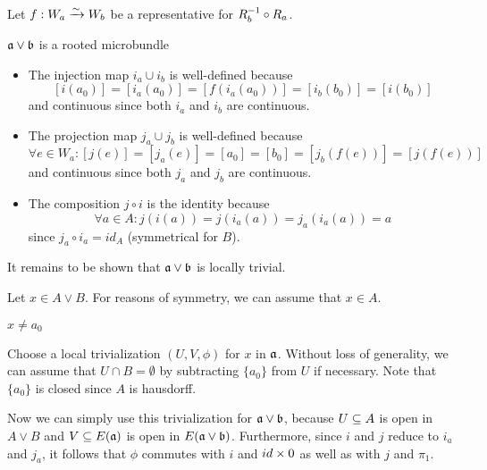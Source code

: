\begin{myproof}
    Let $f: W_a \xrightarrow{\sim} W_b$ be a representative for $R_b^{-1} \circ R_a$.

    \begin{sectionize}
        \item $\ba \vee \bb$ is a rooted microbundle
        \begin{itemize}
            \item The injection map $i_a \cup i_b$ is well-defined because 
            \[ [i(a_0)] = [i_a(a_0)] = [f(i_a(a_0))] = [i_b(b_0)] = [i(b_0)] \]
            and continuous since both $i_a$ and $i_b$ are continuous.
            \item The projection map $j_a \cup j_b$ is well-defined because
            \[ \forall e \in W_a: [j(e)] = [j_a(e)] = [a_0] = [b_0] = [j_b(f(e))] = [j(f(e))] \]
            and continuous since both $j_a$ and $j_b$ are continuous.
            \item The composition $j \circ i$ is the identity because
            \[ \forall a \in A: j(i(a)) = j(i_a(a)) = j_a(i_a(a)) = a \]
            since $j_a \circ i_a = id_A$ (symmetrical for $B$).
        \end{itemize}
        It remains to be shown that $\ba \vee \bb$ is locally trivial.

        Let $x \in A \vee B$.
        For reasons of symmetry, we can assume that $x \in A$.
        \begin{caselist}
            \item $x \neq a_0$
            
            Choose a local trivialization $(U, V, \phi)$ for $x$ in $\mathfrak{a}$.
            Without loss of generality,
            we can assume that $U \cap B = \emptyset$ by subtracting
            $\{a_0\}$ from $U$ if necessary.
            Note that $\{a_0\}$ is closed since $A$ is hausdorff.
            
            Now we can simply use this trivialization for $\ba \vee \bb$, because
            $U \subseteq{} A$ is open in $A \vee B$ and
            $V \subseteq{} E(\mathfrak{a})$ is open in $E(\ba \vee \bb)$.
            Furthermore, since $i$ and $j$ reduce to $i_a$ and $j_a$,
            it follows that $\phi$ commutes with $i$ and $id \times 0$
            as well as with $j$ and $\pi_1$.


\end{caselist}
\end{sectionize}
\end{myproof}
